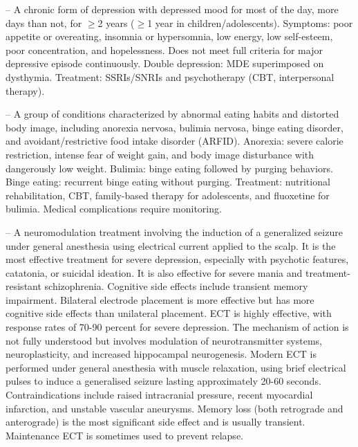 -- A chronic form of depression with depressed mood for most of the day, more days than not, for \(\ge\)2 years (\(\ge\)1 year in children/adolescents). Symptoms: poor appetite or overeating, insomnia or hypersomnia, low energy, low self-esteem, poor concentration, and hopelessness. Does not meet full criteria for major depressive episode continuously. Double depression: MDE superimposed on dysthymia. Treatment: SSRIs/SNRIs and psychotherapy (CBT, interpersonal therapy).

-- A group of conditions characterized by abnormal eating habits and distorted body image, including anorexia nervosa, bulimia nervosa, binge eating disorder, and avoidant/restrictive food intake disorder (ARFID). Anorexia: severe calorie restriction, intense fear of weight gain, and body image disturbance with dangerously low weight. Bulimia: binge eating followed by purging behaviors. Binge eating: recurrent binge eating without purging. Treatment: nutritional rehabilitation, CBT, family-based therapy for adolescents, and fluoxetine for bulimia. Medical complications require monitoring.

-- A neuromodulation treatment involving the induction of a generalized seizure under general anesthesia using electrical current applied to the scalp. It is the most effective treatment for severe depression, especially with psychotic features, catatonia, or suicidal ideation. It is also effective for severe mania and treatment-resistant schizophrenia. Cognitive side effects include transient memory impairment. Bilateral electrode placement is more effective but has more cognitive side effects than unilateral placement. ECT is highly effective, with response rates of 70-90 percent for severe depression. The mechanism of action is not fully understood but involves modulation of neurotransmitter systems, neuroplasticity, and increased hippocampal neurogenesis. Modern ECT is performed under general anesthesia with muscle relaxation, using brief electrical pulses to induce a generalised seizure lasting approximately 20-60 seconds. Contraindications include raised intracranial pressure, recent myocardial infarction, and unstable vascular aneurysms. Memory loss (both retrograde and anterograde) is the most significant side effect and is usually transient. Maintenance ECT is sometimes used to prevent relapse.

